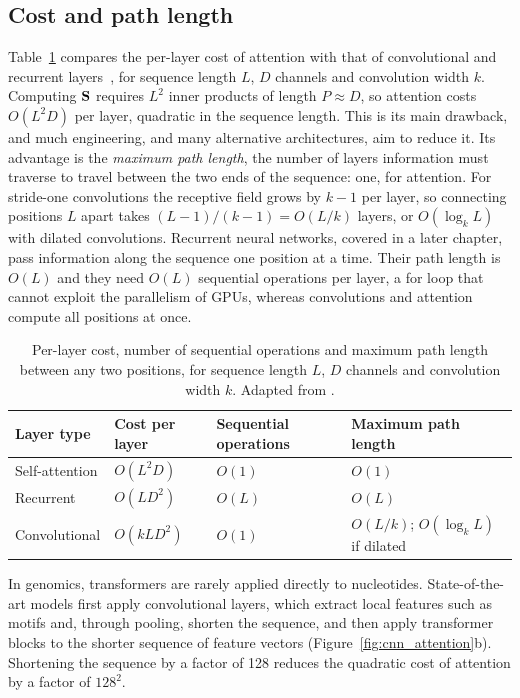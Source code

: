 \subsection{Cost and path length}

Table~\ref{tab:complexity} compares the per-layer cost of attention with that of convolutional and recurrent layers~\citep{vaswani2017}, for sequence length $L$, $D$ channels and convolution width $k$. Computing $\mathbf{S}$ requires $L^2$ inner products of length $P\approx D$, so attention costs $O(L^2D)$ per layer, quadratic in the sequence length. This is its main drawback, and much engineering, and many alternative architectures, aim to reduce it. Its advantage is the \emph{maximum path length}, the number of layers information must traverse to travel between the two ends of the sequence: one, for attention. For stride-one convolutions the receptive field grows by $k-1$ per layer, so connecting positions $L$ apart takes $(L-1)/(k-1)=O(L/k)$ layers, or $O(\log_k L)$ with dilated convolutions. Recurrent neural networks, covered in a later chapter, pass information along the sequence one position at a time. Their path length is $O(L)$ and they need $O(L)$ sequential operations per layer, a for loop that cannot exploit the parallelism of GPUs, whereas convolutions and attention compute all positions at once.

\begin{table}[t]
  \centering
  \caption{Per-layer cost, number of sequential operations and maximum path length between any two positions, for sequence length $L$, $D$ channels and convolution width $k$. Adapted from \citet{vaswani2017}.}
  \label{tab:complexity}
  \begin{tabular}{llll}
    \toprule
    Layer type & Cost per layer & Sequential operations & Maximum path length \\
    \midrule
    Self-attention & $O(L^2D)$ & $O(1)$ & $O(1)$ \\
    Recurrent & $O(LD^2)$ & $O(L)$ & $O(L)$ \\
    Convolutional & $O(kLD^2)$ & $O(1)$ & $O(L/k)$; $O(\log_k L)$ if dilated \\
    \bottomrule
  \end{tabular}
\end{table}

In genomics, transformers are rarely applied directly to nucleotides. State-of-the-art models first apply convolutional layers, which extract local features such as motifs and, through pooling, shorten the sequence, and then apply transformer blocks to the shorter sequence of feature vectors (Figure~\ref{fig:cnn_attention}b). Shortening the sequence by a factor of 128 reduces the quadratic cost of attention by a factor of $128^2$.

